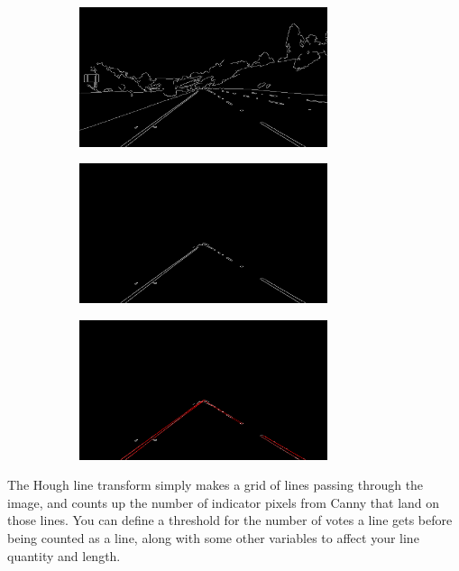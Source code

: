 \documentclass{article}
\begin{document}
\begin{figure}[htb!]
    \begin{subfigure}{0.33\textwidth}
    \centering
    \includegraphics[width=0.8\textwidth]{edges}
    \end{subfigure}%
    \begin{subfigure}{0.33\textwidth}
    \centering
    \includegraphics[width=0.8\textwidth]{maskededges}
    \end{subfigure}%
    \begin{subfigure}{0.33\textwidth}
    \centering
    \includegraphics[width=0.8\textwidth]{maskedhough}
    \end{subfigure}
\end{figure}

The Hough line transform simply makes a grid of lines passing through the image, and counts up the number of indicator pixels from Canny that land on those lines. You can define a threshold for the number of votes a line gets before being counted as a line, along with some other variables to affect your line quantity and length.  
\end{document}
